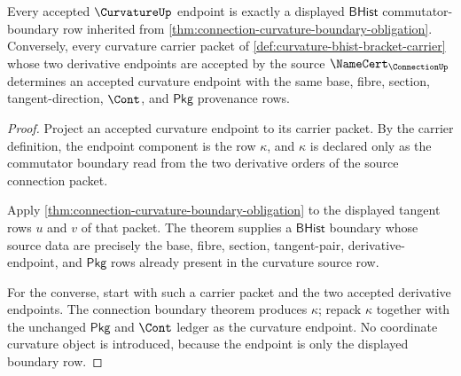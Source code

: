\begin{theorem}
\label{thm:curvature-carrier-boundary-row}
Every accepted $\CurvatureUp$ endpoint is exactly a displayed $\mathsf{BHist}$ commutator-boundary row inherited from \autoref{thm:connection-curvature-boundary-obligation}. Conversely, every curvature carrier packet of \autoref{def:curvature-bhist-bracket-carrier} whose two derivative endpoints are accepted by the source $\NameCert_{\ConnectionUp}$ determines an accepted curvature endpoint with the same base, fibre, section, tangent-direction, $\Cont$, and $\mathsf{Pkg}$ provenance rows.
\end{theorem}
\begin{proof}
Project an accepted curvature endpoint to its carrier packet. By the carrier definition, the endpoint component is the row $\kappa$, and $\kappa$ is declared only as the commutator boundary read from the two derivative orders of the source connection packet.

Apply \autoref{thm:connection-curvature-boundary-obligation} to the displayed tangent rows $u$ and $v$ of that packet. The theorem supplies a $\mathsf{BHist}$ boundary whose source data are precisely the base, fibre, section, tangent-pair, derivative-endpoint, and $\mathsf{Pkg}$ rows already present in the curvature source row.

For the converse, start with such a carrier packet and the two accepted derivative endpoints. The connection boundary theorem produces $\kappa$; repack $\kappa$ together with the unchanged $\mathsf{Pkg}$ and $\Cont$ ledger as the curvature endpoint. No coordinate curvature object is introduced, because the endpoint is only the displayed boundary row.
\end{proof}


